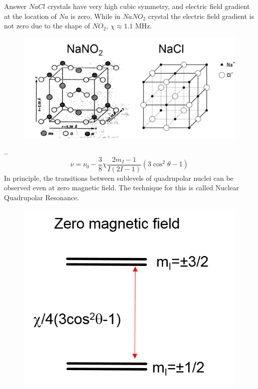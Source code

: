 \documentclass[handout]{beamer}
\begin{document}
\begin{frame}
    \begin{block}{Answer}
    	$NaCl$ crystals have very high cubic symmetry, and electric field gradient at the location of $Na$ is zero. While in $NaNO_2$ crystal the electric field gradient is not zero due to the shape of $NO_2$, $\chi \approx 1.1$ MHz.
    	
    \end{block}

	\begin{figure}
		\centering
		\includegraphics[scale=0.5]{figures/Quadrupole3.png}
	\end{figure}
	
	
\end{frame}

\begin{frame}{\thesection.\thesubsection. \insertsubsection}
	\begin{equation}
	\nu = \nu_0 -\dfrac{3}{8} \chi \dfrac{2 m_I -1}{I(2I -1)}(3 \cos^2 \theta - 1)
	\end{equation}
	In principle, the transitions between sublevels of quadrupolar nuclei can be observed even at zero magnetic field. The technique for this is called \alert{Nuclear Quadrupolar Resonance}.
	\begin{figure}
		\centering
		\includegraphics[scale=0.5]{figures/Quadrupole_ZF.png}
	\end{figure}
\end{frame}
\end{document}
